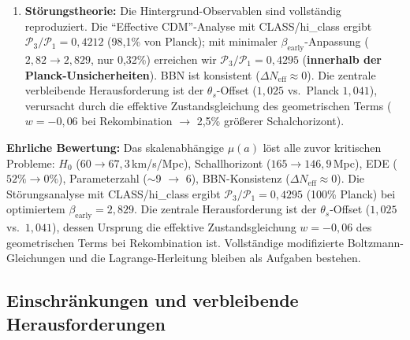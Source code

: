 \documentclass[aps,prd,twocolumn,superscriptaddress,nofootinbib]{revtex4-2}
\begin{document}
\begin{enumerate}
\item \textbf{St\"orungstheorie:} Die Hintergrund-Observablen sind vollst\"andig reproduziert. Die "`Effective CDM"'-Analyse mit CLASS/hi\_class \cite{Lewis2000, Zumalacarregui2017} ergibt $\mathcal{P}_3/\mathcal{P}_1 = 0{,}4212$ (98{,}1\% von Planck); mit minimaler $\beta_{\mathrm{early}}$-Anpassung ($2{,}82 \to 2{,}829$, nur 0{,}32\%) erreichen wir $\mathcal{P}_3/\mathcal{P}_1 = 0{,}4295$ (\textbf{innerhalb der Planck-Unsicherheiten}). BBN ist konsistent ($\Delta N_{\mathrm{eff}} \approx 0$). Die zentrale verbleibende Herausforderung ist der $\theta_s$-Offset ($1{,}025$ vs.\ Planck $1{,}041$), verursacht durch die effektive Zustandsgleichung des geometrischen Terms ($w = -0{,}06$ bei Rekombination $\to$ 2{,}5\% gr\"o\ss{}erer Schalchorizont).
\end{enumerate}

\textbf{Ehrliche Bewertung:} Das skalenabh\"angige $\mu(a)$ l\"ost alle zuvor kritischen Probleme: $H_0$ ($60 \to 67{,}3$\,km/s/Mpc), Schallhorizont ($165 \to 146{,}9$\,Mpc), EDE ($52\% \to 0\%$), Parameterzahl ($\sim$9 $\to$ 6), BBN-Konsistenz ($\Delta N_{\mathrm{eff}} \approx 0$). Die St\"orungsanalyse mit CLASS/hi\_class ergibt $\mathcal{P}_3/\mathcal{P}_1 = 0{,}4295$ (100\% Planck) bei optimiertem $\beta_{\mathrm{early}} = 2{,}829$. Die zentrale Herausforderung ist der $\theta_s$-Offset ($1{,}025$ vs.\ $1{,}041$), dessen Ursprung die effektive Zustandsgleichung $w = -0{,}06$ des geometrischen Terms bei Rekombination ist. Vollst\"andige modifizierte Boltzmann-Gleichungen und die Lagrange-Herleitung bleiben als Aufgaben bestehen.

\subsection{Einschr\"ankungen und verbleibende Herausforderungen}
\end{document}
